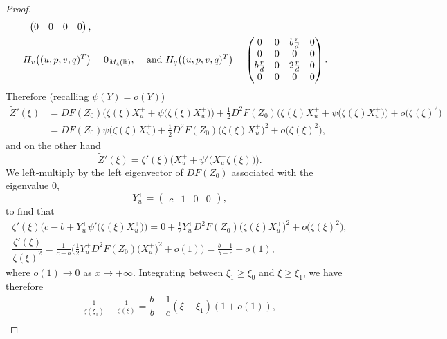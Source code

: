 \documentclass[11pt,a4paper]{article}
\numberwithin{equation}{section}
\numberwithin{figure}{section}
\begin{document}
\begin{proof}
\begin{align*}
\begin{pmatrix}
            0 & 0 & 0 & 0 
        \end{pmatrix},\smallskip \\
        H_v\big((u, p, v, q)^T\big)& = 0_{M_4(\mathbb R)}, &\text{ and }
        H_q\big((u, p, v, q)^T\big) &= 
        \begin{pmatrix}
            0 & 0 & b\frac{r}{d} & 0 \\ 
            0 & 0 & 0 & 0 \\
            b\frac{r}{d} & 0 & 2\frac{r}{d} & 0 \\ 
            0 & 0 & 0 & 0
        \end{pmatrix}.
    \end{align*}
    Therefore  (recalling $\psi(Y)=o(Y)$)
    \begin{align*}
        \tilde Z'(\xi) & =  DF(Z_0)\bigg(\zeta(\xi) X_{u}^{+} + \psi\big(\zeta(\xi) X_{u}^{+}\big)\bigg) + \frac{1}{2} D^2F(Z_0)\bigg(\zeta(\xi) X_{u}^{+} + \psi\big(\zeta(\xi) X_{u}^{+}\big)\bigg)+  o\big(\zeta(\xi)^2\big) \\ 
        &=DF(Z_0)\psi\big(\zeta(\xi)X_{u}^{+}\big) + \frac{1}{2}D^2F(Z_0)\big(\zeta(\xi)X_{u}^{+}\big)^2+  o\big(\zeta(\xi)^2\big), 
    \end{align*}
    and on the other hand
    \begin{equation*}
       \tilde Z'(\xi) = \zeta'(\xi)\bigg(X_{u}^{+} + \psi'\big(X_{u}^{+}\zeta(\xi)\big)\bigg). 
    \end{equation*}
    We left-multiply by the left eigenvector of $DF(Z_0)$ associated with the eigenvalue $0$,
    \begin{equation*}   
        Y_{u}^{+} = 
        \begin{pmatrix}
            c & 1 & 0 & 0
        \end{pmatrix} ,
    \end{equation*}
    to find that
    \begin{gather*}
        \zeta'(\xi)\bigg(c-b + Y_{u}^{+}\psi'\big(\zeta(\xi)X_{u}^{+}\big)\bigg)= 0 + \frac{1}{2}Y_{u}^{+} D^2F(Z_0)\big(\zeta(\xi)X_{u}^{+}\big)^2+  o\big(\zeta(\xi)^2\big), \\ 
        \dfrac{\zeta'(\xi)}{\zeta(\xi)^2} = \frac{1}{c-b}\bigg(\frac{1}{2}Y_{u}^{+} D^2F(Z_0)\big(X_{u}^{+}\big)^2 + o(1)\bigg) = \frac{b-1}{b-c}+o(1), 
    \end{gather*}
    where $o(1)\to 0$ as $x\to+\infty$. Integrating between $\xi_1\geq \xi_0$ and $\xi\geq \xi_1$, we have therefore
    \begin{gather*}
        \frac{1}{\zeta(\xi_1)}-\frac{1}{\zeta(\xi)} = \dfrac{b-1}{b-c}(\xi-\xi_1)(1+o(1)),  \\

\end{gather*}
\end{proof}
\end{document}
